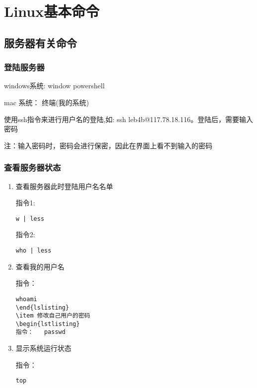 \section{Linux基本命令}

\subsection{服务器有关命令}

\subsubsection{登陆服务器}
windows系统: window  powershell

mac 系统： 终端(我的系统)

使用ssh指令来进行用户名的登陆,如: ssh leb4b@117.78.18.116。登陆后，需要输入密码

注：输入密码时，密码会进行保密，因此在界面上看不到输入的密码


\subsubsection{查看服务器状态}

\begin{enumerate}
    \item 查看服务器此时登陆用户名名单

          指令1:
          \begin{lstlisting}
w | less
\end{lstlisting}

          指令2:
          \begin{lstlisting}
who | less
\end{lstlisting}

    \item 查看我的用户名

          指令：
          \begin{lstlisting}
whoami
\end{lslisting}
\item 修改自己用户的密码
\begin{lstlisting}
指令：   passwd
\end{lstlisting}
    \item 显示系统运行状态

          指令：
          \begin{lstlisting}
top
\end{lstlisting}

\end{enumerate}

